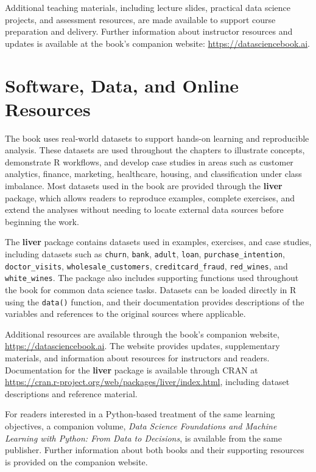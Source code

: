 \documentclass[
  letterpaper,
]{svmono}
\numberwithin{example}{subsection}
\begin{document}
Additional teaching materials, including lecture slides, practical data
science projects, and assessment resources, are made available to
support course preparation and delivery. Further information about
instructor resources and updates is available at the book's companion
website: \url{https://datasciencebook.ai}.

\section*{Software, Data, and Online
Resources}\label{software-data-and-online-resources}


The book uses real-world datasets to support hands-on learning and
reproducible analysis. These datasets are used throughout the chapters
to illustrate concepts, demonstrate R workflows, and develop case
studies in areas such as customer analytics, finance, marketing,
healthcare, housing, and classification under class imbalance. Most
datasets used in the book are provided through the \textbf{liver}
package, which allows readers to reproduce examples, complete exercises,
and extend the analyses without needing to locate external data sources
before beginning the work.

The \textbf{liver} package contains datasets used in examples,
exercises, and case studies, including datasets such as \texttt{churn},
\texttt{bank}, \texttt{adult}, \texttt{loan},
\texttt{purchase\_intention}, \texttt{doctor\_visits},
\texttt{wholesale\_customers}, \texttt{creditcard\_fraud},
\texttt{red\_wines}, and \texttt{white\_wines}. The package also
includes supporting functions used throughout the book for common data
science tasks. Datasets can be loaded directly in R using the
\texttt{data()} function, and their documentation provides descriptions
of the variables and references to the original sources where
applicable.

Additional resources are available through the book's companion website,
\url{https://datasciencebook.ai}. The website provides updates,
supplementary materials, and information about resources for instructors
and readers. Documentation for the \textbf{liver} package is available
through CRAN at
\url{https://cran.r-project.org/web/packages/liver/index.html},
including dataset descriptions and reference material.

For readers interested in a Python-based treatment of the same learning
objectives, a companion volume, \emph{Data Science Foundations and
Machine Learning with Python: From Data to Decisions}, is available from
the same publisher. Further information about both books and their
supporting resources is provided on the companion website.
\end{document}

